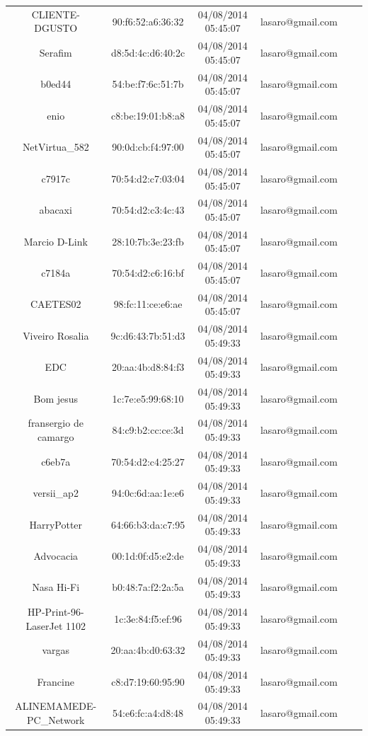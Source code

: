 \documentclass[12pt, %
openright, 
oneside,
a4paper,
brazil]{facom-ufu-abntex2}
\begin{document}
\begin{center}
\begin{longtable}{|c|c|c|c|c|c|}
CLIENTE-DGUSTO & 90:f6:52:a6:36:32 & 04/08/2014 05:45:07 & lasaro@gmail.com \\
Serafim & d8:5d:4c:d6:40:2c & 04/08/2014 05:45:07 & lasaro@gmail.com \\
b0ed44 & 54:be:f7:6c:51:7b & 04/08/2014 05:45:07 & lasaro@gmail.com \\
enio & c8:be:19:01:b8:a8 & 04/08/2014 05:45:07 & lasaro@gmail.com \\
NetVirtua\_582 & 90:0d:cb:f4:97:00 & 04/08/2014 05:45:07 & lasaro@gmail.com \\
c7917c & 70:54:d2:c7:03:04 & 04/08/2014 05:45:07 & lasaro@gmail.com \\
abacaxi & 70:54:d2:c3:4c:43 & 04/08/2014 05:45:07 & lasaro@gmail.com \\
Marcio D-Link & 28:10:7b:3e:23:fb & 04/08/2014 05:45:07 & lasaro@gmail.com \\
c7184a & 70:54:d2:c6:16:bf & 04/08/2014 05:45:07 & lasaro@gmail.com \\
CAETES02 & 98:fc:11:ce:e6:ae & 04/08/2014 05:45:07 & lasaro@gmail.com \\
Viveiro Rosalia & 9c:d6:43:7b:51:d3 & 04/08/2014 05:49:33 & lasaro@gmail.com \\
EDC & 20:aa:4b:d8:84:f3 & 04/08/2014 05:49:33 & lasaro@gmail.com \\
Bom jesus & 1c:7e:e5:99:68:10 & 04/08/2014 05:49:33 & lasaro@gmail.com \\
fransergio de camargo & 84:c9:b2:cc:ce:3d & 04/08/2014 05:49:33 & lasaro@gmail.com \\
c6eb7a & 70:54:d2:c4:25:27 & 04/08/2014 05:49:33 & lasaro@gmail.com \\
versii\_ap2 & 94:0c:6d:aa:1e:e6 & 04/08/2014 05:49:33 & lasaro@gmail.com \\
HarryPotter & 64:66:b3:da:c7:95 & 04/08/2014 05:49:33 & lasaro@gmail.com \\
Advocacia & 00:1d:0f:d5:e2:de & 04/08/2014 05:49:33 & lasaro@gmail.com \\
Nasa Hi-Fi & b0:48:7a:f2:2a:5a & 04/08/2014 05:49:33 & lasaro@gmail.com \\
HP-Print-96-LaserJet 1102 & 1c:3e:84:f5:ef:96 & 04/08/2014 05:49:33 & lasaro@gmail.com \\
vargas & 20:aa:4b:d0:63:32 & 04/08/2014 05:49:33 & lasaro@gmail.com \\
Francine & c8:d7:19:60:95:90 & 04/08/2014 05:49:33 & lasaro@gmail.com \\
ALINEMAMEDE-PC\_Network & 54:e6:fc:a4:d8:48 & 04/08/2014 05:49:33 & lasaro@gmail.com \\

\end{longtable}
\end{center}
\end{document}
